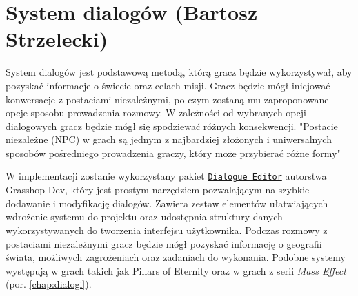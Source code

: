 \section{System dialogów (Bartosz Strzelecki)}\label{s:dial_proj}
System dialogów jest podstawową metodą, którą gracz będzie wykorzystywał, aby pozyskać informacje  o świecie oraz celach misji.
Gracz będzie mógł inicjować konwersacje z postaciami niezależnymi, po czym zostaną mu zaproponowane opcje sposobu prowadzenia rozmowy.
W zależności od wybranych opcji dialogowych gracz będzie mógł się spodziewać różnych konsekwencji.
"Postacie niezależne (NPC) w grach są jednym z najbardziej złożonych i uniwersalnych sposobów pośredniego prowadzenia graczy, który może przybierać różne formy"\cite{projektowanie_gier}

W implementacji zostanie wykorzystany pakiet
\href{https://assetstore.unity.com/packages/tools/utilities/dialogue-editor-168329}{\texttt{Dialogue Editor}} autorstwa Grasshop Dev, który jest prostym narzędziem pozwalającym na szybkie dodawanie i modyfikację dialogów.
Zawiera zestaw elementów ułatwiających wdrożenie systemu do projektu oraz udostępnia struktury danych wykorzystywanych do tworzenia interfejsu użytkownika.
Podczas rozmowy z postaciami niezależnymi gracz będzie mógł pozyskać informację o geografii świata, możliwych zagrożeniach oraz zadaniach do wykonania. 
Podobne systemy występują w grach takich jak Pillars of Eternity oraz w grach z serii \textit{Mass Effect} (por. \ref{chap:dialogi}).

